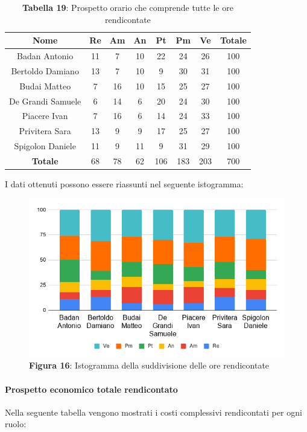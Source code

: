 \begin{table}[H]
	\centering
	\renewcommand{\arraystretch}{1.5}
	\begin{tabular}{|c|c|c|c|c|c|c|c|}
		\hline
		\rowcolor{lighter-grayer}
Nome & Re & Am & An & Pt & Pm & Ve & Totale \\ \hline
Badan Antonio & 11 & 7 & 10 & 22 & 24 & 26 & 100 \\ \hline
Bertoldo Damiano & 13 & 7 & 10 & 9 & 30 & 31 & 100 \\ \hline
Budai Matteo & 7 & 16 & 10 & 15 & 25 & 27 & 100 \\ \hline
De Grandi Samuele & 6 & 14 & 6 & 20 & 24 & 30 & 100 \\ \hline
Piacere Ivan & 7 & 16 & 6 & 14 & 24 & 33 & 100 \\ \hline
Privitera Sara & 13 & 9 & 9 & 17 & 25 & 27 & 100 \\ \hline
Spigolon Daniele & 11 & 9 & 11 & 9 & 31 & 29 & 100 \\ \hline
\textbf{Totale} & 68 & 78 & 62 & 106 & 183 & 203 & 700 \\ \hline
	\end{tabular}
	\caption*{\textbf{Tabella 19}: Prospetto orario che comprende tutte le ore rendicontate\\}
\end{table}	
I dati ottenuti possono essere riassunti nel seguente istogramma:

\begin{figure}[H]
	\centering
	\includegraphics[width=0.7\linewidth]{res/images/IstogrammaTotaleRendicontato.png}
	\caption*{\textbf{Figura 16}: Istogramma della suddivisione delle ore rendicontate}
	\label{fig:Figura10}
\end{figure}

\paragraph{Prospetto economico totale rendicontato}
Nella seguente tabella vengono mostrati i costi complessivi rendicontati per ogni ruolo:

